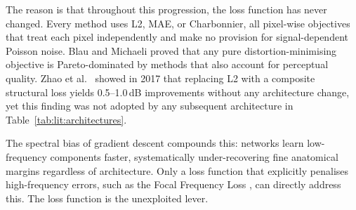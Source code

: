 \documentclass[12pt, a4paper, twoside, openright]{book}
\begin{document}
The reason is that throughout this progression, the loss function has never changed. Every method uses L2, MAE, or Charbonnier, all pixel-wise objectives that treat each pixel independently and make no provision for signal-dependent Poisson noise. Blau and Michaeli \cite{blau_perception_2018} proved that any pure distortion-minimising objective is Pareto-dominated by methods that also account for perceptual quality. Zhao et al.\ \cite{zhao_loss_2017} showed in 2017 that replacing L2 with a composite structural loss yields 0.5--1.0\,dB improvements without any architecture change, yet this finding was not adopted by any subsequent architecture in Table~\ref{tab:lit:architectures}.

The spectral bias of gradient descent \cite{rahaman_spectral_2019} compounds this: networks learn low-frequency components faster, systematically under-recovering fine anatomical margins regardless of architecture. Only a loss function that explicitly penalises high-frequency errors, such as the Focal Frequency Loss \cite{jiang_focal_2021}, can directly address this. The loss function is the unexploited lever.
\end{document}
